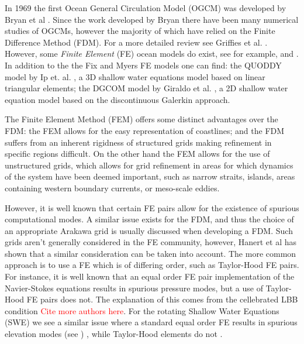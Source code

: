 In 1969 the first Ocean General Circulation Model (OGCM) was developed by Bryan
et al \cite{Bryan1969}. Since the work developed by Bryan there have been many
numerical studies of OGCMs, however the majority of which have relied on the
Finite Difference Method (FDM). For a more detailed review see Griffies et al.
\cite{Griffies2000}. However, some \emph{Finite Element} (FE) ocean models do
exist, see for example, \cite{Fix} and \cite{Myers}. In addition to the the Fix
and Myers FE models one can find: the QUODDY model by Ip et. al.  \cite{Ip1995},
a 3D shallow water equations model based on linear triangular elements; the
DGCOM model by Giraldo et al. \cite{GiraldoWWW}, a 2D shallow water equation
model based on the discontinuous Galerkin approach.

The Finite Element Method (FEM) offers some distinct advantages over the FDM:
the FEM allows for the easy representation of coastlines; and the FDM suffers
from an inherent rigidness of structured grids making refinement in specific
regions difficult. On the other hand the FEM allows for the use of unstructured
grids, which allows for grid refinement in areas for which dynamics of the
system have been deemed important, such as narrow straits, islands, areas
containing western boundary currents, or meso-scale eddies.

However, it is well known that certain FE pairs allow for the existence of
spurious computational modes. A similar issue exists for the FDM, and thus the
choice of an appropriate Arakawa grid is usually discussed when developing a
FDM. Such grids aren't generally considered in the FE community, however, Hanert
et al \cite{Hanert2002} has shown that a similar consideration can be taken into
account. The more common approach is to use a FE which is of differing order,
such as Taylor-Hood FE pairs. For instance, it is well known that an equal order
FE pair implementation of the Navier-Stokes equations results in spurious
pressure modes, but a use of Taylor-Hood FE pairs does not. The explanation of
this comes from the cellebrated LBB condition \cite{Johnson2009}
\textcolor{red}{Cite more authors here}. For the rotating Shallow Water
Equations (SWE) we see a similar issue where a standard equal order FE results
in spurious elevation modes (see \cite{Hanert2002,Hanert2006,Le-Roux2005}) ,
while Taylor-Hood elements do not \cite{Hanert2004}. 

